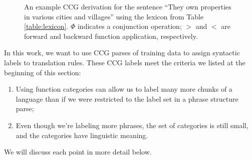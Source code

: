 \documentclass{article}
\begin{document}
\begin{figure}
\centering
{}
\caption{An example CCG derivation for the sentence ``They own properties in various cities and villages'' using the lexicon from Table \ref{table:lexicon}. $\Phi$ indicates a conjunction operation; $>$ and $<$ are forward and backward function application, respectively.\label{fig:ccg-derivation}}
\end{figure}

In this work, we want to use CCG parses of training data to assign syntactic labels to translation rules. These CCG labels meet the criteria we listed at the beginning of this section:
\begin{enumerate}
\item Using function categories can allow us to label many more chunks of a language than if we were restricted to the label set in a phrase structure parse;
\item Even though we're labeling more phrases, the set of categories is still small, and the categories have linguistic meaning.
\end{enumerate}
We will discuss each point in more detail below.
\end{document}
